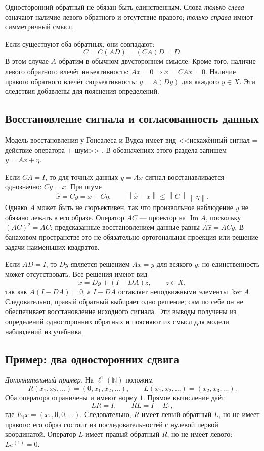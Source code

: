 \documentclass[12pt,a4paper]{article}
\theoremstyle{definition}
\theoremstyle{remark}
\newcommand{\norm}[1]{\left\lVert #1\right\rVert}
\begin{document}
Односторонний обратный не обязан быть единственным. Слова
\emph{только слева} означают наличие левого обратного и отсутствие
правого; \emph{только справа} имеют симметричный смысл.

Если существуют оба обратных, они совпадают:
\[
  C=C(AD)=(CA)D=D.
\]
В этом случае $A$ обратим в обычном двустороннем смысле.
Кроме того, наличие левого обратного влечёт инъективность:
$Ax=0\Rightarrow x=CAx=0$. Наличие правого обратного влечёт
сюръективность: $y=A(Dy)$ для каждого $y\in X$.
Эти следствия добавлены для пояснения определений.

\subsection*{Восстановление сигнала и согласованность данных}

Модель восстановления у Гонсалеса и Вудса имеет вид <<искажённый
сигнал = действие оператора + шум>>
\cite[\S\,5.1, с.~367--368; \S\,5.5, с.~406]{GW2012}.
В обозначениях этого раздела запишем $y=Ax+\eta$.

Если $CA=I$, то для точных данных $y=Ax$ сигнал восстанавливается
однозначно: $Cy=x$. При шуме
\[
  \widehat x=Cy=x+C\eta,\qquad
  \norm{\widehat x-x}\leqslant\norm C\,\norm\eta.
\]
Однако $A$ может быть не сюръективен, так что произвольное
наблюдение $y$ не обязано лежать в его образе. Оператор $AC$ ---
проектор на $\operatorname{Im}A$, поскольку $(AC)^2=AC$;
предсказанные восстановлением данные равны $A\widehat x=ACy$.
В банаховом пространстве это не обязательно ортогональная
проекция или решение задачи наименьших квадратов.

Если $AD=I$, то $Dy$ является решением $Ax=y$ для всякого $y$,
но единственность может отсутствовать. Все решения имеют вид
\[
  x=Dy+(I-DA)z,\qquad z\in X,
\]
так как $A(I-DA)=0$, а $I-DA$ оставляет неподвижными элементы
$\ker A$. Следовательно, правый обратный выбирает одно решение;
сам по себе он не обеспечивает восстановление исходного сигнала.
Эти выводы получены из определений односторонних обратных и поясняют
их смысл для модели наблюдений из учебника.

\subsection{Пример: два односторонних сдвига}

\emph{Дополнительный пример.} На $\ell^1(\mathbb N)$ положим
\[
  R(x_1,x_2,\ldots)=(0,x_1,x_2,\ldots),\qquad
  L(x_1,x_2,\ldots)=(x_2,x_3,\ldots).
\]
Оба оператора ограничены и имеют норму $1$. Прямое вычисление даёт
\[
  LR=I,\qquad RL=I-E_1,
\]
где $E_1x=(x_1,0,0,\ldots)$.
Следовательно, $R$ имеет левый обратный $L$, но не имеет правого:
его образ состоит из последовательностей с нулевой первой координатой.
Оператор $L$ имеет правый обратный $R$, но не имеет левого:
$Le^{(1)}=0$.
\end{document}
